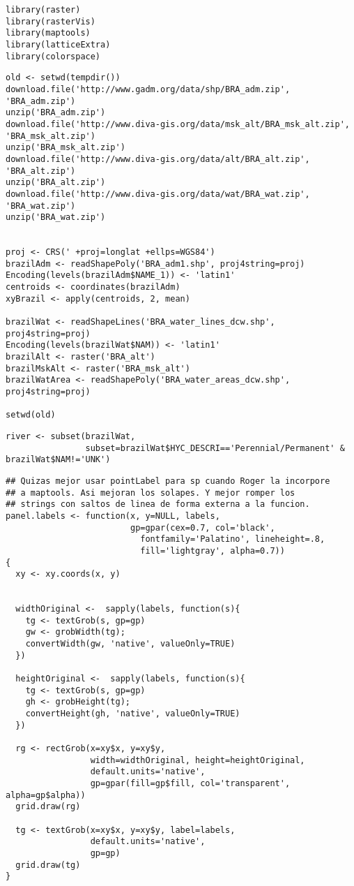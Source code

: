 



\lstset{language=R}
\begin{lstlisting}
library(raster)
library(rasterVis)
library(maptools)
library(latticeExtra)
library(colorspace)
\end{lstlisting}


\lstset{language=R}
\begin{lstlisting}
old <- setwd(tempdir())
download.file('http://www.gadm.org/data/shp/BRA_adm.zip', 'BRA_adm.zip')
unzip('BRA_adm.zip')
download.file('http://www.diva-gis.org/data/msk_alt/BRA_msk_alt.zip', 'BRA_msk_alt.zip')
unzip('BRA_msk_alt.zip')
download.file('http://www.diva-gis.org/data/alt/BRA_alt.zip', 'BRA_alt.zip')
unzip('BRA_alt.zip')
download.file('http://www.diva-gis.org/data/wat/BRA_wat.zip', 'BRA_wat.zip')
unzip('BRA_wat.zip')


proj <- CRS(' +proj=longlat +ellps=WGS84')
brazilAdm <- readShapePoly('BRA_adm1.shp', proj4string=proj)
Encoding(levels(brazilAdm$NAME_1)) <- 'latin1'
centroids <- coordinates(brazilAdm)
xyBrazil <- apply(centroids, 2, mean)

brazilWat <- readShapeLines('BRA_water_lines_dcw.shp', proj4string=proj)
Encoding(levels(brazilWat$NAM)) <- 'latin1'
brazilAlt <- raster('BRA_alt')
brazilMskAlt <- raster('BRA_msk_alt')
brazilWatArea <- readShapePoly('BRA_water_areas_dcw.shp', proj4string=proj)

setwd(old)
\end{lstlisting}




\lstset{language=R}
\begin{lstlisting}
river <- subset(brazilWat,
                subset=brazilWat$HYC_DESCRI=='Perennial/Permanent' & brazilWat$NAM!='UNK')
\end{lstlisting}


\lstset{language=R}
\begin{lstlisting}
## Quizas mejor usar pointLabel para sp cuando Roger la incorpore
## a maptools. Asi mejoran los solapes. Y mejor romper los
## strings con saltos de linea de forma externa a la funcion.
panel.labels <- function(x, y=NULL, labels,
                         gp=gpar(cex=0.7, col='black',
                           fontfamily='Palatino', lineheight=.8,
                           fill='lightgray', alpha=0.7))
{
  xy <- xy.coords(x, y)


  widthOriginal <-  sapply(labels, function(s){
    tg <- textGrob(s, gp=gp)
    gw <- grobWidth(tg);
    convertWidth(gw, 'native', valueOnly=TRUE)
  })

  heightOriginal <-  sapply(labels, function(s){
    tg <- textGrob(s, gp=gp)
    gh <- grobHeight(tg);
    convertHeight(gh, 'native', valueOnly=TRUE)
  })

  rg <- rectGrob(x=xy$x, y=xy$y,
                 width=widthOriginal, height=heightOriginal,
                 default.units='native',
                 gp=gpar(fill=gp$fill, col='transparent', alpha=gp$alpha))
  grid.draw(rg)

  tg <- textGrob(x=xy$x, y=xy$y, label=labels,
                 default.units='native',
                 gp=gp)
  grid.draw(tg)
}
\end{lstlisting}


